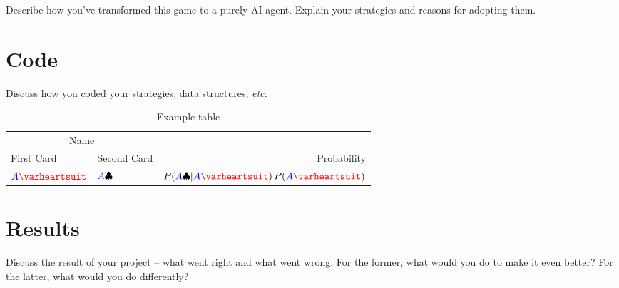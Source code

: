 \documentclass[10pt, a4paper, twocolumn]{article} %
\newcommand*\Hs[1]{\ensuremath{{\color{blue} #1}{\color{red}\varheartsuit}}}
\newcommand*\Cs[1]{\ensuremath{{\color{blue} #1}{\color{black}\clubsuit}}}
\begin{document}
Describe how you've transformed this game to a purely AI agent.  Explain your strategies and reasons for adopting them.

\section{Code}

Discuss how you coded your strategies, data structures, {\it etc.}
\begin{table}
	\caption{Example table}
	\centering
	\begin{tabular}{llr}
		\toprule
		\multicolumn{2}{c}{Name} \\
		\cmidrule(r){1-2}
		First Card & Second Card  & Probability \\
		\midrule
		\Hs{A} & \Cs{A} & $P(\Cs{A}|\Hs{A})\,P(\Hs{A})$ \\
		\bottomrule
	\end{tabular}
\end{table}


\section{Results}
Discuss the result of your project -- what went right and what went wrong.  For the former, what would you do to make it even better? For the latter, what would you do differently?



\end{document}
